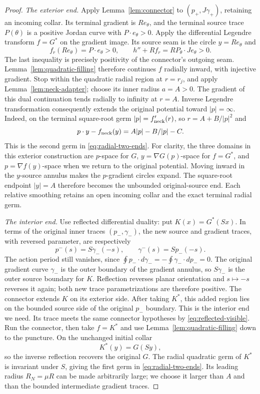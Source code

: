 \documentclass[11pt]{amsart}
\theoremstyle{definition}
\theoremstyle{remark}
\numberwithin{equation}{section}
\begin{document}
\begin{proof}
\emph{The exterior end.}
Apply Lemma~\ref{lem:connector} to $(p_+,J\gamma_+)$, retaining an
incoming collar. Its terminal gradient is $Re_\theta$, and the
terminal source trace $P(\theta)$ is a positive Jordan curve with
$P\cdot e_\theta>0$. Apply the differential Legendre transform
$f=G^*$ on the gradient image. Its source seam is the circle
$y=Re_\theta$ and
\[
 f_r(Re_\theta)=P\cdot e_\theta>0,\qquad
 h''+Rf_r=R P_\theta\cdot Je_\theta>0.
\]
The last inequality is precisely positivity of the connector's
outgoing seam. Lemma~\ref{lem:quadratic-filling} therefore continues
$f$ radially inward, with injective gradient. Stop within the
quadratic radial region at $r=r_j$, and apply
Lemma~\ref{lem:neck-adapter}; choose its inner radius $a=A>0$.
The gradient of this dual continuation tends radially to infinity at
$r=A$. Inverse Legendre transformation consequently extends the
original potential toward $|p|=\infty$. Indeed, on the terminal
square-root germ $|p|=f_{\rm neck}'(r)$, so
$r=A+B/|p|^2$ and
\[
 p\cdot y-f_{\rm neck}(y)=A|p|-B/|p|-C.
\]
This is the second germ in \eqref{eq:radial-two-ends}.
For clarity, the three domains in this exterior construction are
$ p $-space for $G$, $y=\nabla G(p)$-space for $f=G^*$, and
$p=\nabla f(y)$-space when we return to the original potential.
Moving inward in the $y$-source annulus makes the $p$-gradient
circles expand. The square-root endpoint $|y|=A$ therefore becomes
the unbounded original-source end. Each relative smoothing retains
an open incoming collar and the exact terminal radial germ.

\emph{The interior end.}
Use reflected differential duality: put $K(x)=G^*(Sx)$. In terms
of the original inner traces $(p_-,\gamma_-)$, the new source and
gradient traces, with reversed parameter, are respectively
\[
 p^-(s)=S\gamma_-(-s),\qquad \gamma^-(s)=Sp_-(-s).
\]
The action period still vanishes, since
$\oint p_-\cdot d\gamma_-=-\oint\gamma_-\cdot dp_-=0$.
The original gradient curve $\gamma_-$ is the outer boundary
of the gradient annulus, so $S\gamma_-$ is the outer source boundary
for $K$. Reflection reverses planar orientation and $s\mapsto-s$
reverses it again; both new trace parametrizations are therefore
positive. The connector extends $K$ on its exterior side. After
taking $K^*$, this added region lies on the bounded source side of
the original $p_-$ boundary. This is the interior end we need. Its trace meets the same connector
hypotheses by \eqref{eq:reflected-visible}. Run the connector, then
take $f=K^*$ and use Lemma~\ref{lem:quadratic-filling} down to the
puncture. On the unchanged initial collar
\[
 K^*(y)=G(Sy),
\]
so the inverse reflection recovers the original $G$. The radial
quadratic germ of $K^*$ is invariant under $S$, giving the first
germ in \eqref{eq:radial-two-ends}. Its leading radius
$R_N=\mu R$ can be made arbitrarily large; we choose it larger than
$A$ and than the bounded intermediate gradient traces.


\end{proof}
\end{document}
